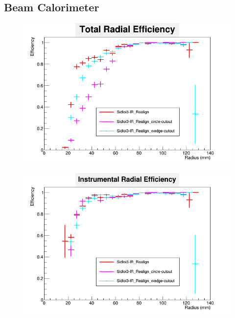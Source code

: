 \documentclass{report}
\begin{document}
            \subsection{Beam Calorimeter}
                \begin{figure}[H] 
                    \includegraphics[width=\textwidth]{RadialEfficiency_total_geom}
                    \centering
                    \caption{}
                    \label{fig:geom_beamcal_total}
                \end{figure}
                \begin{figure}[H]
                    \includegraphics[width=\textwidth]{RadialEfficiency_instrumental_geom}
                    \centering
                    \caption{}
                    \label{fig:geom_beamcal_inst}
                \end{figure}
\end{document}
